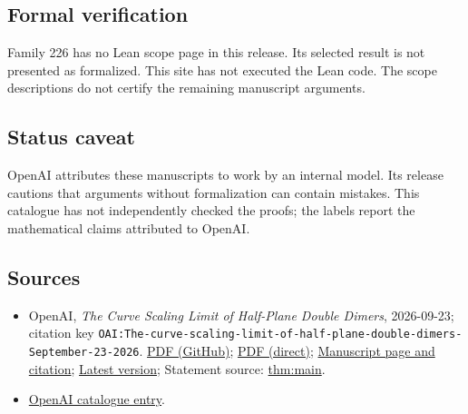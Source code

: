 \documentclass[11pt]{article}
\begin{document}
\subsection{Formal verification}
Family 226 has no Lean scope page in this release. Its selected result is not presented as formalized. This site has not executed the Lean code. The scope descriptions do not certify the remaining manuscript arguments.

\subsection{Status caveat}
OpenAI attributes these manuscripts to work by an internal model. Its release cautions that arguments without formalization can contain mistakes. This catalogue has not independently checked the proofs; the labels report the mathematical claims attributed to OpenAI.

\subsection{Sources}
\begin{itemize}
\item OpenAI, \emph{The Curve Scaling Limit of Half-Plane Double Dimers}, 2026-09-23; citation key \texttt{OAI:The-curve-scaling-limit-of-half-plane-double-dimers-September-23-2026}. \href{https://github.com/openai/math/blob/adc7f1241b42e322a6451854ab7e4b4c146bf78a/preprints/The-curve-scaling-limit-of-half-plane-double-dimers-September-23-2026/paper.pdf}{PDF (GitHub)}; \href{https://github.com/openai/math/raw/adc7f1241b42e322a6451854ab7e4b4c146bf78a/preprints/The-curve-scaling-limit-of-half-plane-double-dimers-September-23-2026/paper.pdf}{PDF (direct)}; \href{https://github.com/openai/math/blob/adc7f1241b42e322a6451854ab7e4b4c146bf78a/preprints/The-curve-scaling-limit-of-half-plane-double-dimers-September-23-2026/README.md}{Manuscript page and citation}; \href{https://github.com/openai/math/blob/main/preprints/The-curve-scaling-limit-of-half-plane-double-dimers-September-23-2026/paper.pdf}{Latest version}; Statement source: \href{https://github.com/openai/math/blob/adc7f1241b42e322a6451854ab7e4b4c146bf78a/preprints/The-curve-scaling-limit-of-half-plane-double-dimers-September-23-2026/build/sections/10-introduction.tex\#L84}{thm:main}.
\item \href{https://github.com/openai/math/blob/adc7f1241b42e322a6451854ab7e4b4c146bf78a/CONTENTS.md}{OpenAI catalogue entry}.
\end{itemize}
\end{document}
